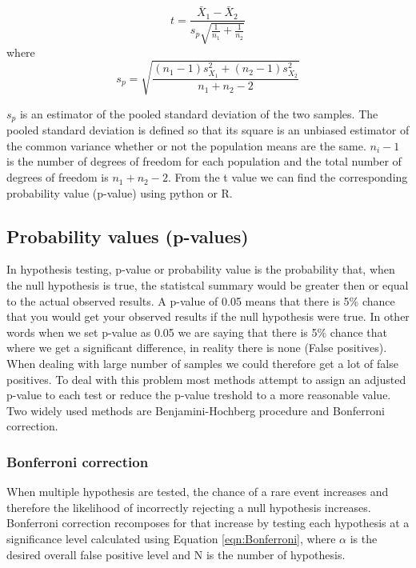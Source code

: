 \begin{equation}
\label{eqn:ttest}
    t = \frac{\bar{X}_1 - \bar{X}_2}{s_p\sqrt{\frac{1}{n_1}+ \frac{1}{n_2}}}
\end{equation}
where
\begin{equation}
\label{eqn:sdelta}
    s_p = \sqrt{\frac{(n_1-1)s_{X_1}^2+(n_2-1)s_{X_2}^2}{n_1+n_2-2}}
\end{equation}

$s_p$ is an estimator of the pooled standard deviation of the two samples. The pooled standard deviation is defined so that its square is an unbiased estimator of the common variance whether or not the population means are the same. $n_i-1$ is the number of degrees of freedom for each population and the total number of degrees of freedom is $n_1+n_2-2$. From the t value we can find the corresponding probability value (p-value) using python or R.

\subsection{Probability values (p-values)}
In hypothesis testing, p-value or probability value is the probability that, when the null hypothesis is true, the statistcal summary would be greater then or equal to the actual observed results. A p-value of 0.05 means that there is 5\% chance that you would get your observed results if the null hypothesis were true. In other words when we set p-value as 0.05 we are saying that there is 5\% chance that where we get a significant difference, in reality there is none (False positives). When dealing with large number of samples we could therefore get a lot of false positives. To deal with this problem most methods attempt to assign an adjusted p-value to each test or reduce the p-value treshold to a more reasonable value. Two widely used methods are Benjamini-Hochberg procedure and Bonferroni correction.

\subsubsection{Bonferroni correction}
When multiple hypothesis are tested, the chance of a rare event increases and therefore the likelihood of incorrectly rejecting a null hypothesis increases. Bonferroni correction recomposes for that increase by testing each hypothesis at a significance level calculated using Equation \ref{eqn:Bonferroni}, where $\alpha$ is the desired overall false positive level and N is the number of hypothesis.

